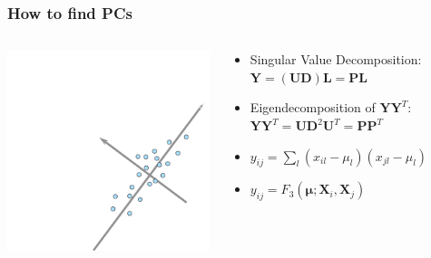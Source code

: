 \documentclass[11pt]{beamer}
\newcommand{\MX}{\mathbf{X}} %
\newcommand{\MY}{\mathbf{Y}} %
\newcommand{\MP}{\mathbf{P}} %
\newcommand{\MEAN}{\boldsymbol{\mu}} %
\begin{document}
\begin{frame}
	\frametitle{How to find PCs}
\begin{columns}
	\begin{column}{0.4\textwidth}
	\includegraphics[width=\textwidth]{figures/pca3.pdf}
	\end{column}
	\begin{column}{0.6\textwidth}
	\begin{itemize}
	\item<1-> Singular Value Decomposition: $\MY = (\mathbf{U}\mathbf{D})\mathbf{L} = \mathbf{P}\mathbf{L}$
	\item<2-> Eigendecomposition of $\MY\MY^T$: $\MY\MY^T = \mathbf{U}\mathbf{D}^2\mathbf{U}^T = \MP\MP^T$
	\only<3>{\item $y_{ij}$}
	\item<4-> $y_{ij} = \sum_l (x_{il} - \mu_l)(x_{jl} - \mu_l)$
	\item<5-> $y_{ij} = F_3(\MEAN; \MX_i, \MX_j)$
	\end{itemize}
	\end{column}			
\end{columns}
\vspace{30px}
\end{frame}
\end{document}
